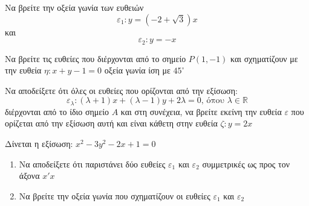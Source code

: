 \documentclass{presentation}
\begin{document}
\begin{askisi} Να βρείτε την οξεία γωνία των ευθειών
  $$ε_1:y=(-2+\sqrt{3})x$$
  και
  $$ε_2:y=-x$$
\end{askisi}

\begin{askisi} Να βρείτε τις ευθείες που διέρχονται από το σημείο $Ρ(1,-1)$ και σχηματίζουν με την ευθεία $η:x+y-1=0$ οξεία γωνία ίση με $45^{\circ}$

\end{askisi}

\begin{askisi} Να αποδείξετε ότι όλες οι ευθείες που ορίζονται από την εξίσωση:
  $$ε_λ:(λ+1)x+(λ-1)y+2λ=0 \text{, όπου } λ\in\mathbb{R}$$
  διέρχονται από το ίδιο σημείο $Α$ και στη συνέχεια, να βρείτε εκείνη την ευθεία $ε$ που ορίζεται από την εξίσωση αυτή και είναι κάθετη στην ευθεία $ζ:y=2x$
\end{askisi}

\begin{askisi} Δίνεται η εξίσωση: $x^2-3y^2-2x+1=0$
  \begin{enumerate}
    \item<1-> Να αποδείξετε ότι παριστάνει δύο ευθείες $ε_1$ και $ε_2$ συμμετρικές ως προς τον άξονα $x'x$
    \item<2-> Να βρείτε την οξεία γωνία που σχηματίζουν οι ευθείες $ε_1$ και $ε_2$
  \end{enumerate}

\end{askisi}

% 

\moodle
\end{document}
